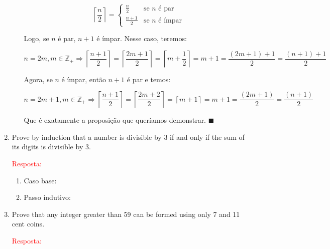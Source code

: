 \documentclass{article}
\newcommand*{\QEDA}{\hfill\ensuremath{\blacksquare}}%
\begin{document}
\begin{enumerate}
\begin{enumerate}[itemsep=0pt, label=(\roman*)]
    \[
    \left \lceil\frac{n}{2} \right \rceil=
    \left\{
    \begin{array}{ll}
    \frac{n}{2}& \textrm{se $n$ é par}\\
    \frac{n+1}{2}& \textrm{se $n$ é ímpar}
    \end{array}
    \right.
    \]
    
    Logo, se $n$ é par, $n+1$ é ímpar. Nesse caso, teremos: 
    
    \begin{equation}\label{ind:3-ind}
        n = 2m, m \in \mathbb{Z_{+}} \Rightarrow{} \left \lceil \frac{n+1}{2} \right \rceil = \left \lceil \frac{2m+1}{2}\right \rceil = \left \lceil m+\frac{1}{2}\right \rceil = m+1 = \frac{(2m+1)+1}{2} = \frac{(n+1)+1}{2}
    \end{equation}
    
    Agora, se $n$ é ímpar, então $n+1$ é par e temos:
    
    \begin{equation}\label{ind:3-ind}
        n = 2m+1, m \in \mathbb{Z_{+}} \Rightarrow{} \left \lceil \frac{n+1}{2} \right \rceil = \left \lceil \frac{2m+2}{2}\right \rceil = \left \lceil m+1\right \rceil = m+1 = \frac{(2m+1)}{2} = \frac{(n+1)}{2}
    \end{equation}
    
    Que é exatamente a proposição que queríamos demonstrar. \QEDA
    
    \end{enumerate}
  
  
  
    \item Prove by induction that a number is divisible by 3 if and only if the sum of its digits is divisible by 3.
    
    \textcolor{red}{Resposta: }
    \begin{enumerate}[itemsep=0pt, label=(\roman*)]
    
    \item Caso base:
    
    \item Passo indutivo:
    
    \end{enumerate}
    
    
    
    \item Prove that any integer greater than 59 can be formed using only 7 and 11 cent coins.
    
    \textcolor{red}{Resposta: }
    \begin{enumerate}[itemsep=0pt, label=(\roman*)]
    

\end{enumerate}
\end{enumerate}
\end{document}
